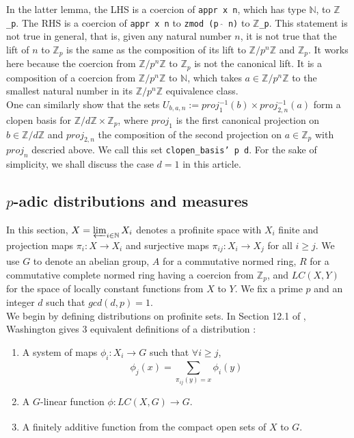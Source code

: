 \documentclass[a4paper,UKenglish,cleveref, autoref, thm-restate]{lipics-v2021}
\newcommand{\lean}[1]{\texttt{#1}\xspace} %
\begin{document}
In the latter lemma, the LHS is a coercion of \lean{appr x n}, which has type \lean{$\mathbb{N}$}, to \lean{$\mathbb{Z}$\_p}. 
The RHS is a coercion of \lean{appr x n} to \lean{zmod (p $\hat{}$ n)} to \lean{$\mathbb{Z}$\_p}. 
This statement is not true in general, that is, given any natural number $n$, it is not true that the lift of $n$ to $\mathbb{Z}_p$ 
is the same as the composition of its lift to $\mathbb{Z}/p^n \mathbb{Z}$ and $\mathbb{Z}_p$. 
It works here because the coercion from $\mathbb{Z}/p^n \mathbb{Z}$ to $\mathbb{Z}_p$ is not the canonical lift.
It is a composition of a coercion from $\mathbb{Z}/p^n \mathbb{Z}$ to $\mathbb{N}$, which takes
$a \in \mathbb{Z}/p^n \mathbb{Z}$ to the smallest natural number in its
$\mathbb{Z}/p^n \mathbb{Z}$ equivalence class. \\

One can similarly show that the sets $U_{b, a, n} := proj_1^{-1} (b) \times proj_{2,n} ^{-1} (a)$ form a clopen basis for 
$\mathbb{Z} / d \mathbb{Z} \times \mathbb{Z}_p$, where $proj_1$ is the first canonical projection on $b \in \mathbb{Z} / d \mathbb{Z}$ 
and $proj_{2,n}$ the composition of the second projection on $a \in \mathbb{Z}_p$ with $proj_n$ descried above. We call this set 
\lean{clopen\_basis' p d}. For the sake of simplicity, we shall discuss the case $d = 1$ in this article.

\subsection{$p$-adic distributions and measures}
In this section, $X = \varprojlim_{i \in \mathbb{N}} X_i$ denotes a profinite space with $X_i$ finite and
projection maps $\pi_i : X \xrightarrow[]{} X_i$ and surjective maps
$\pi_{ij} : X_i \xrightarrow[]{} X_j$ for all $i \ge j$. We use $G$ to denote an abelian group,
$A$ for a commutative normed ring, $R$ for a commutative complete normed ring having a coercion from $\mathbb{Z}_p$, 
and $LC(X,Y)$ for the space of locally constant functions from $X$ to $Y$. 
We fix a prime $p$ and an integer $d$ such that $gcd(d, p) =1$. \\

We begin by defining distributions on profinite sets. In Section 12.1 of \cite{cyc}, Washington
gives 3 equivalent definitions of a distribution :
\begin{enumerate}
  \item A system of maps $\phi_i : X_i \xrightarrow[]{} G$ such that $\forall i \ge j$,
  $$ \phi_j(x) = \sum_{\pi_{ij}(y) = x} \phi_i(y) $$
  \item A $G$-linear function $\phi : LC(X, G) \xrightarrow[]{} G$.
  \item A finitely additive function from the compact open sets of $X$ to $G$.
\end{enumerate}
\end{document}

